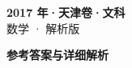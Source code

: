 \documentclass[zihao=-4, a4paper]{ctexart}
\begin{document}
\begin{center}
  {\Large\bfseries 2017 年·天津卷·文科}\\[4pt]
  {\large 数学 · 解析版}
\end{center}
\medskip
{}

\clearpage
{}
\begin{center}{\Large\bfseries 参考答案与详细解析}\end{center}
\medskip

\end{document}
